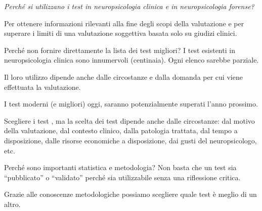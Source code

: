 \documentclass[
  ignorenonframetext,
]{beamer}
\begin{document}
\begin{frame}{}
\label{section}
\emph{Perché si utilizzano i test in neuropsicologia clinica e in
neuropsicologia forense?}

\pause

Per ottenere informazioni rilevanti alla fine degli scopi della
valutazione e per superare i limiti di una valutazione soggettiva basata
solo su giudizi clinici.
\end{frame}

\begin{frame}{Perché non fornire direttamente la lista dei test
migliori?}
\label{perchuxe9-non-fornire-direttamente-la-lista-dei-test-migliori}
I test esistenti in neuropsicologia clinica sono innumervoli
(centinaia). Ogni elenco sarebbe parziale.

Il loro utilizzo dipende anche dalle circostanze e dalla domanda per cui
viene effettuata la valutazione.

I test moderni (e migliori) oggi, saranno potenzialmente superati l'anno
prossimo.
\end{frame}

\begin{frame}{Scegliere i test}
\label{scegliere-i-test}
\setlength{\fboxrule}{1mm}
, ma la scelta dei test dipende anche  dalle circostanze: dal motivo della valutazione, dal contesto clinico, dalla patologia trattata, dal tempo a disposizione, dalle risorse economiche a disposizione, dai gusti del
neuropsicologo, etc.
\end{frame}

\begin{frame}{Perché sono importanti statistica e metodologia?}
\label{perchuxe9-sono-importanti-statistica-e-metodologia}
Non basta che un test sia ``pubblicato'' o ``validato'' perché sia
utilizzabile senza una riflessione critica.

\vspace{2em}

Grazie alle conoscenze metodologiche possiamo scegliere quale test è
meglio di un altro.

\pause
\vspace{2em}

\begin{center}
\end{center}
\end{frame}
\end{document}
